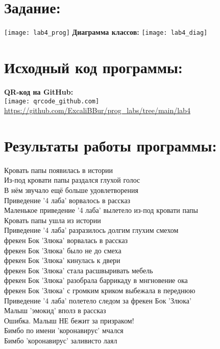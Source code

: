\tableofcontents
\newpage
\begin{center}
\section{Задание:}
\texttt{[image: lab4\_prog]}
\vspace{1em}
\textbf{Диаграмма классов:}
\texttt{[image: lab4\_diag]}
\newpage
\section{Исходный код программы:}
\textbf{QR-код на GitHub:}\\
\texttt{[image: qrcode\_github.com]}
\vspace{5em}
\url{https://github.com/ExcaliBBur/prog_labs/tree/main/lab4}
\section{Результаты работы программы:}
\begin{flushleft}
Кровать папы появилась в истории \\
Из-под кровати папы раздался глухой голос \\
В нём звучало ещё больше удовлетворения\\
Приведение '4 лаба' ворвалось в рассказ\\
Маленькое приведение '4 лаба' вылетело из-под кровати папы\\
Кровать папы ушла из истории\\
Приведение '4 лаба' разразилось долгим глухим смехом\\
фрекен Бок 'Злюка' ворвалась в рассказ\\
фрекен Бок 'Злюка' было не до смеха\\
фрекен Бок 'Злюка' кинулась к двери\\
фрекен Бок 'Злюка' стала расшвыривать мебель\\
фрекен Бок 'Злюка' разобрала баррикаду в мнгновение ока\\
фрекен Бок 'Злюка' с громким криком выбежала в переднюю\\
Приведение '4 лаба' полетело следом за фрекен Бок 'Злюка'\\
Малыш 'эмокид' вполз в рассказ\\
Ошибка. Малыш НЕ бежит за призраком!\\
Бимбо по имени 'коронавирус' мчался\\
Бимбо 'коронавирус' заливисто лаял\\

\end{flushleft}
\end{center}
